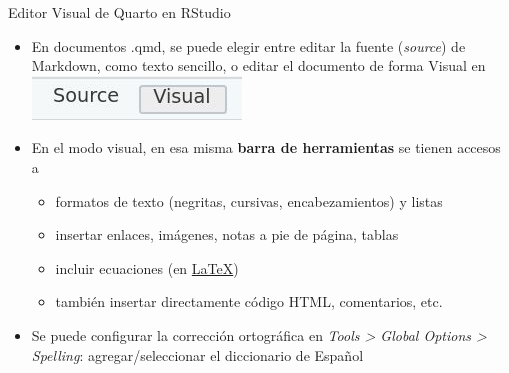 \documentclass[
  10pt,
  ignorenonframetext,
]{beamer}
\providecommand{\tightlist}{%
  \setlength{\itemsep}{0pt}\setlength{\parskip}{0pt}}\usepackage{longtable,booktabs,array}
\begin{document}
\begin{frame}{Editor Visual de Quarto en RStudio}
\label{editor-visual-de-quarto-en-rstudio}
\begin{itemize}
\item
  En documentos .qmd, se puede elegir entre editar la fuente
  (\emph{source}) de Markdown, como texto sencillo, o editar el
  documento de forma Visual en \includegraphics{figure/Visual.jpg}
\item
  En el modo visual, en esa misma \textbf{barra de herramientas} se
  tienen accesos a

  \begin{itemize}
  \tightlist
  \item
    formatos de texto (negritas, cursivas, encabezamientos) y listas
  \item
    insertar enlaces, imágenes, notas a pie de página, tablas
  \item
    incluir ecuaciones (en
    \href{https://www.latex4technics.com/}{LaTeX})
  \item
    también insertar directamente código HTML, comentarios, etc.
  \end{itemize}
\item
  Se puede configurar la corrección ortográfica en \emph{Tools
  \textgreater{} Global Options \textgreater{} Spelling}:
  agregar/seleccionar el diccionario de Español
\end{itemize}
\end{frame}
\end{document}
